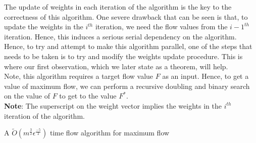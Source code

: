 \documentclass[BTech]{iitmdiss}
\begin{document}
	      The update of weights in each iteration of the algorithm is the key to the correctness of this algorithm. One severe drawback that can 
	      be seen is that, to update the weights in the $i^{th}$ iteration, we need the flow values from the $i-1^{th}$ iteration. Hence, this 
	      induces a serious serial dependency on the algorithm. Hence, to try and attempt to make this algorithm parallel, one of the steps that 
	      needs to be taken is to try and modify the weights update procedure. This is where our first observation, which we later state as a theorem,
	      will help.\\
	      
	      Note, this algorithm requires a target flow value $F$ as an input. Hence, to get a value of maximum flow, we can perform a recursive
	      doubling and binary search on the value of $F$ to get to the value $F^{\ast}$. \\
	      
	      
	      \textbf{Note}: The superscript on the weight vector implies the weights in the $i^{th}$ iteration of the algorithm. \\
	      
	      \begin{algorithm}[H]
	        \caption{A $\widetilde{O}(m^{\frac{3}{2}}\epsilon^{\frac{-5}{2}})$ time flow algorithm for maximum flow}
	      \end{algorithm}
	    
\end{document}
